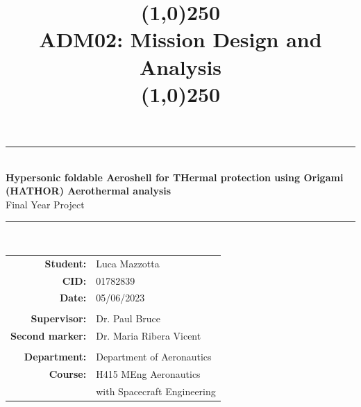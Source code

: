 \begin{titlepage}
\vspace*{-2cm}
\centerline{}
\vspace{2cm}

\centering

\vspace{-2cm}

\newcommand{\HRule}{\rule{\linewidth}{0.5mm}} %
 
\center %
 
 
 
 
 
\HRule \\[0.4cm]
{ \huge \bfseries Hypersonic foldable Aeroshell for THermal protection using Origami (HATHOR) Aerothermal analysis}\\[0.4cm] %
{\large Final Year Project}
\HRule \\[3cm]
 
\title{\line(1,0){250}\\ADM02: Mission Design and Analysis\\\line(1,0){250}}
\vspace{-2.5cm} 

\vspace{0.5cm}
\begin{tabular}{rl}
\centering
{\bf Student:} & Luca Mazzotta
\\
{\bf CID:} & 01782839
\\
{\bf    Date:} & {05/06/2023}
\\
\\
{\bf Supervisor:} & Dr. Paul Bruce
\\
{\bf Second marker:} & Dr. Maria Ribera Vicent
\\
\\
{\bf Department:} & {Department of Aeronautics}  
\\
{\bf    Course:} & {H415 MEng Aeronautics}
\\
{} & {with Spacecraft Engineering}  



\end{tabular}
\end{titlepage}
